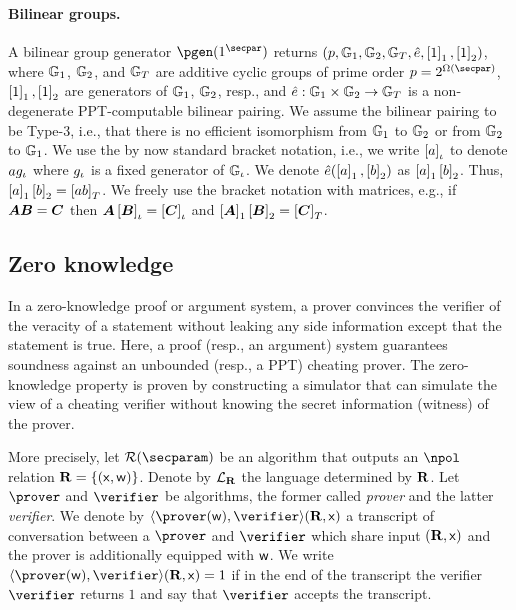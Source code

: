 \documentclass[runningheads]{llncs}
\let\spvec\vec
\let\vec\accentvec
\let\vec\spvec
\def\vec#1{\mathchoice{\mbox{\boldmath$\displaystyle#1$}}
	{\mbox{\boldmath$\textstyle#1$}}
	{\mbox{\boldmath$\scriptstyle#1$}}
	{\mbox{\boldmath$\scriptscriptstyle#1$}}}
\theoremstyle{definition}
\begin{document}
\paragraph{Bilinear groups.}
A bilinear group generator $\pgen (1^\secpar)$ returns $(p, \mathbb{G}_1, \mathbb{G}_2, \mathbb{G}_T, \hat{e}, \left[1\right]_{1}, \left[1\right]_{2})$, where $\mathbb{G}_1$, $\mathbb{G}_2$, and $\mathbb{G}_T$ are additive cyclic groups of prime order $p = 2^{\Omega (\secpar)}$, $\left[1\right]_{1}, \left[1\right]_{2}$ are generators of $\mathbb{G}_1$, $\mathbb{G}_2$, resp., and $\hat{e}: \mathbb{G}_1 \times \mathbb{G}_2 \to \mathbb{G}_T$ is a non-degenerate PPT-computable bilinear pairing.
We assume the bilinear pairing to be Type-3, i.e., that there is no efficient isomorphism from $\mathbb{G}_1$ to $\mathbb{G}_2$ or from $\mathbb{G}_2$ to $\mathbb{G}_1$.
We use the by now standard bracket notation, i.e., we write $\left[a\right]_{\iota}$ to denote $a g_{\iota}$ where $g_{\iota}$ is a fixed generator of $\mathbb{G}_{\iota}$.
We denote $\hat{e} (\left[a\right]_{1}, \left[b\right]_{2})$ as $\left[a\right]_{1} \left[b\right]_{2}$.
Thus, $\left[a\right]_{1} \left[b\right]_{2} = \left[a b\right]_{T}$.
We freely use the bracket notation with matrices, e.g., if $\vec{A} \vec{B} = \vec{C}$ then $\vec{A} \grpgi{\vec{B}} = \grpgi{\vec{C}}$ and $\gone{\vec{A}} \gtwo{\vec{B}} = \gtar{\vec{C}}$.

\subsection{Zero knowledge}
In a zero-knowledge proof or argument system, a prover convinces the verifier of the veracity of a statement without leaking any side information except that the statement is true.
Here, a proof (resp., an argument) system guarantees soundness against an unbounded (resp., a PPT) cheating prover.
The zero-knowledge property is proven by constructing a simulator that can simulate the view of a cheating verifier without knowing the secret information (witness) of the prover.


More precisely, let $\RELGEN(\secparam)$ be an algorithm that outputs an $\npol$ relation $\mathbf{R} = \{(\mathsf{x}, \mathsf{w})\}$. Denote by $\mathcal{L}_{\mathbf{R}}$ the language determined by $\mathbf{R}$. 
Let $\prover$ and $\verifier$ be algorithms, the former called \emph{prover} and the latter \emph{verifier}. 
We denote by $\ip{\prover (\wit)}{\verifier}(\REL, \inp)$ a transcript of conversation between a $\prover$ and $\verifier$ which share input $(\mathbf{R}, \mathsf{x})$ and the prover is additionally equipped with $\mathsf{w}$. 
We write $\ip{\prover (\wit)}{\verifier}(\REL, \inp) = 1$ if in the end of the transcript the verifier $\verifier$ returns $1$ and say that $\verifier$ accepts the transcript.
\end{document}
